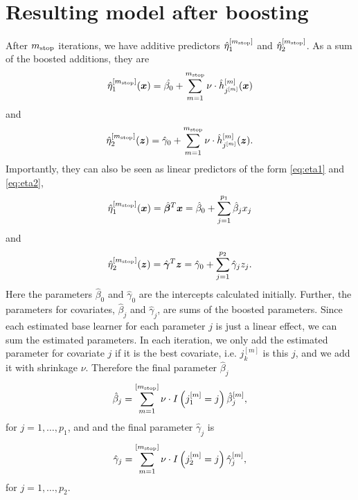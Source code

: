 \section{Resulting model after boosting}
After $m_{\text{stop}}$ iterations, we have additive predictors $\hat{\eta}_1^{[m_{\text{stop}}]}$ and $\hat{\eta}_2^{[m_{\text{stop}}]}$.
As a sum of the boosted additions, they are
\begin{equation*}
    \hat{\eta}_1^{[m_{\text{stop}}]}(\bm{x})=\hat{\beta_0}+\sum_{m=1}^{m_{\text{stop}}}\nu\cdot \hat{h}_{j^{[m]}}^{[m]}(\bm{x})
\end{equation*}
and
\begin{equation*}
    \hat{\eta}_2^{[m_{\text{stop}}]}(\bm{z})=\hat{\gamma}_0+\sum_{m=1}^{m_{\text{stop}}}\nu\cdot \hat{h}_{j^{[m]}}^{[m]}(\bm{z}).
\end{equation*}
Importantly, they can also be seen as linear predictors of the form \eqref{eq:eta1} and \eqref{eq:eta2},
\begin{equation*}
    \hat{\eta}_1^{[m_{\text{stop}}]}(\bm{x})=\hat{\boldsymbol{\beta}}^T\bm{x}=\hat{\beta}_0+\sum_{j=1}^{p_1}\hat{\beta}_jx_j
\end{equation*}
and
\begin{equation*}
    \hat{\eta}_2^{[m_{\text{stop}}]}(\bm{z})=\hat{\boldsymbol{\gamma}}^T\bm{z}=\hat{\gamma}_0+\sum_{j=1}^{p_2}\hat{\gamma}_jz_j.
\end{equation*}
Here the parameters $\hat{\beta}_0$ and $\hat{\gamma}_0$ are the intercepts calculated initially.
Further, the parameters for covariates, $\hat{\beta}_j$ and $\hat{\gamma}_j$, are sums of the boosted parameters.
Since each estimated base learner for each parameter $j$ is just a linear effect, we can sum the estimated parameters.
In each iteration, we only add the estimated parameter for covariate $j$ if it is the best covariate, i.e. $j_k^{[m]}$ is this $j$, and we add it with shrinkage $\nu$.
Therefore the final parameter $\hat{\beta}_j$
\begin{equation*}
    \hat{\beta}_j=\sum_{m=1}^{[m_{\text{stop}}]}\nu\cdot I\left(j_1^{[m]}=j\right)\hat{\beta}_j^{[m]},
\end{equation*}
for $j=1,\ldots,p_1$, and
and the final parameter $\hat{\gamma}_j$ is
\begin{equation*}
    \hat{\gamma}_j=\sum_{m=1}^{[m_{\text{stop}}]}\nu\cdot I\left(j_2^{[m]}=j\right)\hat{\gamma}_j^{[m]},
\end{equation*}
for $j=1,\ldots,p_2$.


